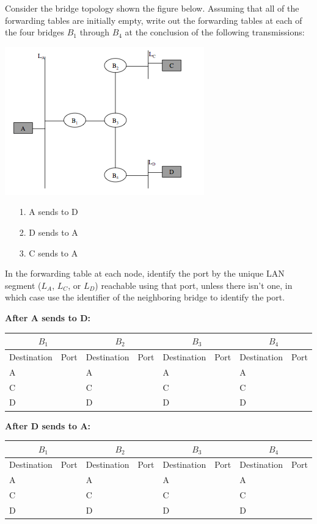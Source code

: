 \documentclass[11pt]{article}
\begin{document}
\newpage
{} Consider the bridge topology shown the figure below. Assuming that
all of the forwarding tables are initially empty, write out the
forwarding tables at each of the four bridges $B_1$ through $B_4$ at the
conclusion of the following transmissions: 
\begin{center}\includegraphics[width=0.5\linewidth]{lan-topo}\end{center}
\begin{itemize}
\item[1.] A sends to D 
\item[2.] D sends to A 
\item[3.] C sends to A
\end{itemize}
In the forwarding table at each node, identify the port by the unique
LAN segment ($L_A$, $L_C$, or $L_D$) reachable using that port, unless there
isn't one, in which case use the identifier of the neighboring bridge to
identify the port. 

{\bf After A sends to D:}

\begin{tabular}{|l|l||l|l||l|l||l|l|}
\multicolumn{2}{c}{\bf $B_1$} &
\multicolumn{2}{c}{\bf $B_2$} &
\multicolumn{2}{c}{\bf $B_3$} &
\multicolumn{2}{c}{\bf $B_4$} \\ \hline
Destination & Port & Destination & Port & Destination & Port &
Destination & Port \\ \hline
A & & A & & A & & A & \\
C & & C & & C & & C & \\
D & & D & & D & & D & \\
\hline
\end{tabular}


{\bf After D sends to A:}

\begin{tabular}{|l|l||l|l||l|l||l|l|}
\multicolumn{2}{c}{\bf $B_1$} &
\multicolumn{2}{c}{\bf $B_2$} &
\multicolumn{2}{c}{\bf $B_3$} &
\multicolumn{2}{c}{\bf $B_4$} \\ \hline
Destination & Port & Destination & Port & Destination & Port &
Destination & Port \\ \hline
A & & A & & A & & A & \\
C & & C & & C & & C & \\
D & & D & & D & & D & \\
\hline
\end{tabular}
\end{document}
